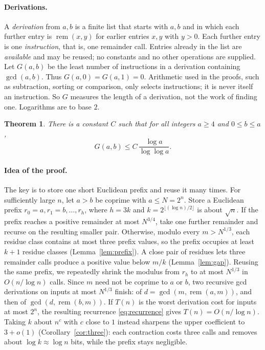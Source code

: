 \documentclass[11pt]{article}
\newtheorem{theorem}{Theorem}
\theoremstyle{remark}
\newcommand{\rem}{\operatorname{rem}}
\begin{document}
\paragraph{Derivations.}
A \emph{derivation} from $a,b$ is a finite list that starts with $a,b$ and in
which each further entry is $\rem(x,y)$ for earlier entries $x,y$ with $y>0$.
Each further entry is one \emph{instruction}, that is, one remainder call.
Entries already in the list are \emph{available} and may be reused; no
constants and no other operations are supplied. Let $G(a,b)$ be the least
number of instructions in a derivation containing $\gcd(a,b)$. Thus
$G(a,0)=G(a,1)=0$. Arithmetic used in the proofs, such as subtraction,
sorting or comparison, only selects instructions; it is never itself an
instruction. So $G$ measures the length of a derivation, not the work of
finding one. Logarithms are to base $2$.

\begin{theorem}\label{thm:main}
There is a constant $C$ such that for all integers $a\geq4$ and $0\leq b\leq a$,
\[
G(a,b)\leq C\,\frac{\log a}{\log\log a}.
\]
\end{theorem}

\paragraph{Idea of the proof.}
The key is to store one short Euclidean prefix and reuse it many times.
For sufficiently large $n$, let $a>b$ be coprime with $a\leq N=2^n$.
Store a Euclidean prefix
$r_0=a,r_1=b,\ldots,r_h$, where $h=3k$ and $k=2^{\lfloor(\log n)/2\rfloor}$
is about $\sqrt n$.
If the prefix reaches a positive remainder at most $N^{3/4}$, take one
further remainder and recurse on the resulting smaller pair.
Otherwise, modulo every $m>N^{1/3}$, each residue class contains at most
three prefix values, so the prefix occupies at least $k+1$ residue
classes (Lemma~\ref{lem:prefix}). A close pair of residues lets three
remainder calls produce a positive value below $m/k$
(Lemma~\ref{lem:gap}). Reusing the same prefix, we repeatedly shrink the
modulus from $r_h$ to at most $N^{1/3}$ in $O(n/\log n)$ calls.
Since $m$ need not be coprime to $a$ or $b$, two recursive gcd
derivations on inputs at most $N^{1/3}$ finish: of $d=\gcd(m,\rem(a,m))$,
and then of $\gcd(d,\rem(b,m))$.
If $T(n)$ is the worst derivation cost for inputs at most $2^n$, the
resulting recurrence \eqref{eq:recurrence} gives $T(n)=O(n/\log n)$.
Taking $k$ about $n^c$ with $c$ close to $1$ instead sharpens the upper
coefficient to $3+o(1)$ (Corollary~\ref{cor:three}): each contraction costs
three calls and removes about $\log k\approx\log n$ bits, while the prefix
stays negligible.
\end{document}
